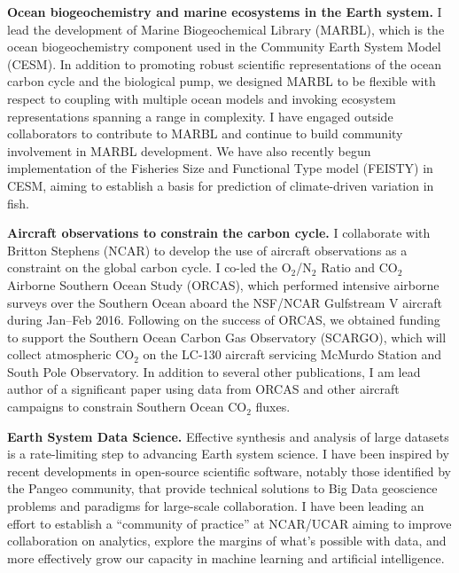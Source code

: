 \documentclass[11pt]{article}
\begin{document}
\begin{description}[style=multiline,leftmargin=0.5cm,font=\normalfont]
\item \textbf{Ocean biogeochemistry and marine ecosystems in the Earth system.}
I lead the development of Marine Biogeochemical Library (MARBL), which is the ocean biogeochemistry component used in the Community Earth System Model (CESM).
In addition to promoting robust scientific representations of the ocean carbon cycle and the biological pump, we designed MARBL to be flexible with respect to coupling with multiple ocean models and invoking ecosystem representations spanning a range in complexity.
I have engaged outside collaborators to contribute to MARBL and continue to build community involvement in MARBL development.
We have also recently begun implementation of the Fisheries Size and Functional Type model (FEISTY) in CESM, aiming to establish a basis for prediction of climate-driven variation in fish.


\item \textbf{Aircraft observations to constrain the carbon cycle.}
I collaborate with Britton Stephens (NCAR) to develop the use of aircraft observations as a constraint on the global carbon cycle.
I co-led the O$_2$/N$_2$ Ratio and CO$_2$ Airborne Southern Ocean Study (ORCAS), which performed intensive airborne surveys over the Southern Ocean aboard the NSF/NCAR Gulfstream V aircraft during Jan--Feb 2016.
Following on the success of ORCAS, we obtained funding to support the Southern Ocean Carbon Gas Observatory (SCARGO), which will collect atmospheric CO$_2$ on the LC-130 aircraft servicing McMurdo Station and South Pole Observatory.
In addition to several other publications, I am lead author of a significant paper using data from ORCAS and other aircraft campaigns to constrain Southern Ocean CO$_2$ fluxes.

\item \textbf{Earth System Data Science.} Effective synthesis and analysis of large datasets is a rate-limiting step to advancing Earth system science.
I have been inspired by recent developments in open-source scientific software, notably those identified by the Pangeo community, that provide technical solutions to Big Data geoscience problems and paradigms for large-scale collaboration.
I have been leading an effort to establish a “community of practice” at NCAR/UCAR aiming to improve collaboration on analytics, explore the margins of what’s possible with data, and more effectively grow our capacity in machine learning and artificial intelligence.


\end{description}
\end{document}
